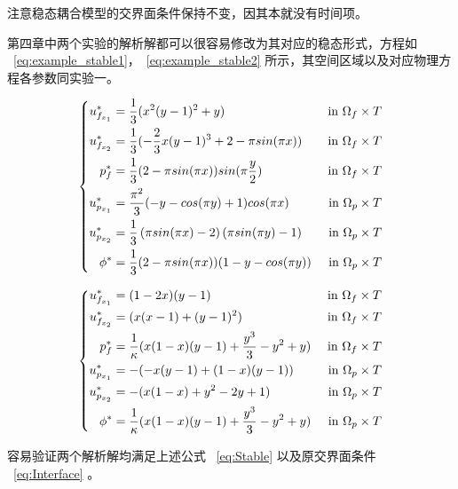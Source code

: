 注意稳态耦合模型的交界面条件保持不变，因其本就没有时间项。

第四章中两个实验的解析解都可以很容易修改为其对应的稳态形式，方程如 ~\eqref{eq:example_stable1}，~\eqref{eq:example_stable2} 所示，其空间区域以及对应物理方程各参数同实验一。

\begin{equation}\label{eq:example_stable1}
    \left\{
    \begin{aligned}
        \Ufi[1]^* &= \frac{1}{3} \* (x^2 \* (y-1)^2 + y) &\textrm{ in } \Df\\
        \Ufi[2]^* &= \frac{1}{3} \* (-\frac{2}{3} \* x \* (y-1)^3 + 2 - \pi \* sin(\pi \* x)) &\textrm{ in } \Df\\
        \pf^* &= \frac{1}{3} \* (2 - \pi \* sin(\pi \* x)) \* sin(\pi \* \frac{y}{2}) &\textrm{ in } \Df\\
        \Upi[1]^* &= \frac{\pi^2}{3} \* (-y - cos(\pi \* y) + 1) \* cos(\pi \* x) &\textrm{ in } \Dp\\
        \Upi[2]^* &= \frac{1}{3} \* \left(\pi \* sin(\pi \* x) - 2\right) \* \left(\pi \* sin(\pi \* y) - 1 \right) &\textrm{ in } \Dp\\
        \pp^* &= \frac{1}{3} \* (2 - \pi \* sin(\pi \* x)) \* (1 - y - cos(\pi \* y)) &\textrm{ in } \Dp
    \end{aligned}
    \right.
\end{equation}

\begin{equation}\label{eq:example_stable2}
    \left\{
    \begin{aligned}
        \Ufi[1]^* &= (1 - 2 \* x) \* (y - 1) &\textrm{ in } \Df\\
        \Ufi[2]^* &= (x \* (x - 1) + (y - 1)^2) &\textrm{ in } \Df\\
        \pf^* &= \frac{1}{\kappa} \* (x \* (1 - x) \* (y - 1) + \frac{y^3}{3} - y^2 + y) &\textrm{ in } \Df\\
        \Upi[1]^* &= -(-x \* (y - 1) + (1 - x) \* (y - 1)) &\textrm{ in } \Dp\\
        \Upi[2]^* &= -(x \* (1 - x) + y^2 - 2 \* y + 1) &\textrm{ in } \Dp\\
        \pp^* &= \frac{1}{\kappa} \* (x \* (1 - x) \* (y - 1) + \frac{y^3}{3} - y^2 + y) &\textrm{ in } \Dp
    \end{aligned}
    \right.
\end{equation}

容易验证两个解析解均满足上述公式 ~\eqref{eq:Stable} 以及原交界面条件 ~\eqref{eq:Interface} 。

